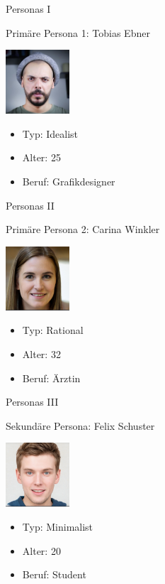 \documentclass[presentation,bigger,aspectratio=169]{beamer}
\begin{document}
\begin{frame}[label={sec:org188d978}]{Personas I}
\begin{block}{Primäre Persona 1: Tobias Ebner}
\begin{center}
\includegraphics[width=90px]{./img/m1_persona_1_idealist.png}
\end{center}
\begin{itemize}
\item Typ: Idealist
\item Alter: 25
\item Beruf: Grafikdesigner
\end{itemize}
\end{block}
\end{frame}
\begin{frame}[label={sec:org5b5a331}]{Personas II}
\begin{block}{Primäre Persona 2: Carina Winkler}
\begin{center}
\includegraphics[width=90px]{./img/m1_persona_2_rational.png}
\end{center}
\begin{itemize}
\item Typ: Rational
\item Alter: 32
\item Beruf: Ärztin
\end{itemize}
\end{block}
\end{frame}
\begin{frame}[label={sec:org11502ba}]{Personas III}
\begin{block}{Sekundäre Persona: Felix Schuster}
\begin{center}
\includegraphics[width=90px]{./img/m1_persona_3_rational.png}
\end{center}
\begin{itemize}
\item Typ: Minimalist
\item Alter: 20
\item Beruf: Student
\end{itemize}
\end{block}
\end{frame}
\end{document}
